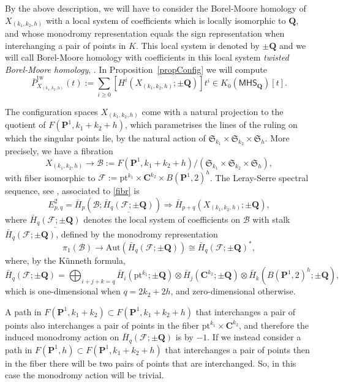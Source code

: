 \documentclass[10pt,a4paper,twoside]{amsart}
\theoremstyle{plain}
\theoremstyle{definition}
\theoremstyle{remark}
\begin{document}
By the above description, we will have to consider the Borel-Moore homology of $X_{(k_1,k_2,h)}$ with a local system of coefficients which is locally isomorphic to $\mathbf{Q},$ and whose monodromy representation equals the sign representation when interchanging a pair of points in $K$. 
This local system is denoted by $\pm\mathbf{Q}$ and we will call Borel-Moore homology with coefficients in this local system 
\textit{twisted Borel-Moore homology}, \cite{TomM4}. In Proposition~\ref{propConfig} we will compute 
\[
\bar{P}^{\mathrm{tw}}_{X_{(k_1,k_2,h)}}(t):=\sum_{i \geq 0}\left[H^i(X_{(k_1,k_2,h)};\pm \mathbf{Q})\right]t^i \in K_0(\mathsf{MHS}_{\mathbf{Q}})\left[t\right].
\]

The configuration spaces $X_{(k_1,k_2,h)}$ 
come with a natural projection to the quotient of $F(\mathbf{P}^1,k_1+k_2+h)$, which parametrises the lines of the ruling on which the singular points lie, by the natural action of $\mathfrak{S}_{k_1}\times\mathfrak{S}_{k_2}\times\mathfrak{S}_h$. 
More precisely, we have a fibration
\begin{equation}\label{fibr}X_{(k_1,k_2,h)}\rightarrow \mathcal{B}:=F(\mathbf{P}^1,k_1+k_2+h)/(\mathfrak{S}_{k_1}\times\mathfrak{S}_{k_2}\times\mathfrak{S}_h),\end{equation}
with fiber isomorphic to $\mathcal{F}:=\mathrm{pt}^{k_1}\times \mathbf{C}^{k_2}\times B(\mathbf{P}^1,2)^h$. 
The Leray-Serre spectral sequence, see \cite[Theorem 9.6]{DK}, associated to \eqref{fibr} is 
\begin{equation}\label{ss1}
E^2_{p,q}=\bar{H}_p(\mathcal{B};\underline{\bar{H}_q(\mathcal{F};\pm\mathbf{Q})})\Rightarrow\bar{H}_{p+q}(X_{(k_1,k_2,h)};\pm\mathbf{Q}),
\end{equation}
 where $\underline{\bar{H}_q(\mathcal{F};\pm\mathbf{Q})}$ denotes the local system of coefficients on $\mathcal{B}$ with stalk $\bar{H}_q(\mathcal{F};\pm\mathbf{Q})$, 
defined by the monodromy representation 
$$\pi_1(\mathcal{B})\rightarrow \mathrm{Aut} (\bar{H}_q(\mathcal{F};\pm\mathbf{Q}))\cong \bar{H}_q(\mathcal{F};\pm\mathbf{Q})^*,$$
where, by the K\"unneth formula, 
\begin{equation} \label{kunneth}
\bar{H}_q(\mathcal{F};\pm\mathbf{Q})=\bigoplus_{i+j+k=q} \bar{H}_i(\mathrm{pt}^{k_1};\pm\mathbf{Q})\otimes\bar{H}_j(\mathbf{C}^{k_2};\pm\mathbf{Q})\otimes\bar{H}_k(B(\mathbf{P}^1,2)^h;\pm\mathbf{Q}),\end{equation}
which is one-dimensional when $q=2k_2+2h$, and zero-dimensional otherwise.

A path in $F(\mathbf{P}^1,k_1+k_2) \subset F(\mathbf{P}^1,k_1+k_2+h)$ that interchanges a pair of points also interchanges a pair of points in the fiber $\mathrm{pt}^{k_1}\times \mathbf{C}^{k_2}$, and therefore the induced monodromy action on $\bar{H}_q(\mathcal{F};\pm\mathbf{Q})$ is by $-1$. 
If we instead consider a path in $F(\mathbf{P}^1,h) \subset F(\mathbf{P}^1,k_1+k_2+h)$ that interchanges a pair of points then in the fiber there will be two pairs of points that are interchanged. 
So, in this case the monodromy action will be trivial. 
\end{document}
